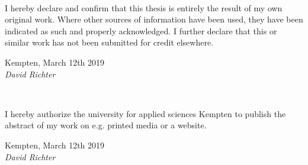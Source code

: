 \documentclass[12pt,oneside,listof=totoc,paper=a4,headings=small]{scrbook}
\begin{document}

\\

\vspace*{2cm}


\noindent
I hereby declare and confirm that this thesis is entirely the result of my own original work. Where other sources of information have been used, they have been indicated as such and properly acknowledged. I further declare that this or similar work has not been submitted for credit elsewhere.
\vspace{2cm}

\noindent
Kempten, March 12th 2019 
\hspace*{2cm}%
\dotfill\\
\hspace*{8.5cm}%
\textit{David Richter}

\vspace*{5cm}

\\

\vspace*{2cm}

\noindent
I hereby authorize the university for applied sciences Kempten to publish the abstract of my work on e.g. printed media or a website.
\vspace{2cm}

\noindent
Kempten, March 12th 2019 
\hspace*{2cm}%
\dotfill\\
\hspace*{8.5cm}%
\textit{David Richter}


\newpage
\shipout\null
\end{document}
